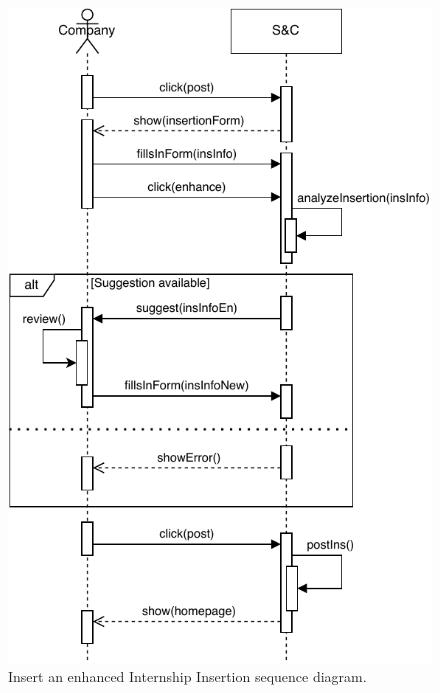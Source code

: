 \begin{figure}[H]
    \begin{center}
        \includegraphics[width=\linewidth]{Images/SequenceDiagram/InsertInternSD.pdf}
        \caption{Insert an enhanced Internship Insertion sequence diagram.}
        \label{fig:insert_intern_seqdiag}%
    \end{center}
\end{figure}


